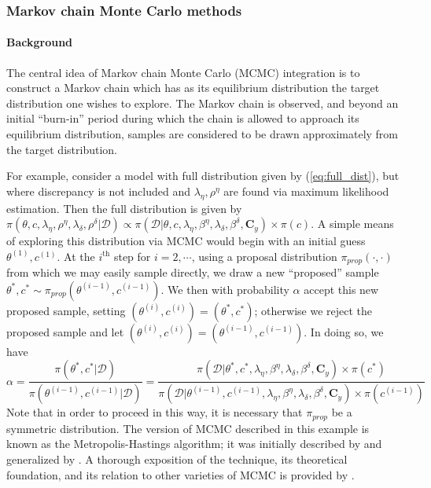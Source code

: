 \documentclass{article}
\begin{document}
\subsubsection{Markov chain Monte Carlo methods}

\paragraph{Background}

The central idea of Markov chain Monte Carlo (MCMC) integration is to construct a Markov chain which has as its equilibrium distribution the target distribution one wishes to explore. The Markov chain is observed, and beyond an initial ``burn-in'' period during which the chain is allowed to approach its equilibrium distribution, samples are considered to be drawn approximately from the target distribution.

For example, consider a model with full distribution given by (\ref{eq:full_dist}), but where discrepancy is not included and $\lambda_\eta,\rho^\eta$ are found via maximum likelihood estimation. Then the full distribution is given by $\pi(\theta,c,\lambda_\eta,\rho^\eta,\lambda_\delta,\rho^\delta|\mathcal D)
\propto \pi(\mathcal D | \theta,c,\lambda_\eta, \beta^\eta,\lambda_\delta,\beta^\delta,\mathbf C_y) \times \pi(c)$. A simple means of exploring this distribution via MCMC would begin with an initial guess $\theta^{(1)},c^{(1)}$. At the $i^{\text{th} }$ step for $i=2,\cdots$, using a proposal distribution $\pi_{prop}(\cdot,\cdot)$ from which we may easily sample directly, we draw a new ``proposed'' sample $\theta^*,c^*\sim \pi_{prop}(\theta^{(i-1)},c^{(i-1)})$. We then with probability $\alpha$ accept this new proposed sample, setting $(\theta^{(i)},c^{(i)}) = (\theta^*,c^*)$; otherwise we reject the proposed sample and let $(\theta^{(i)},c^{(i)}) = (\theta^{(i-1)},c^{(i-1)})$. In doing so, we have 
\[
\alpha = \frac{\pi(\theta^*,c^* | \mathcal D)}{ \pi(\theta^{(i-1)},c^{(i-1)}|\mathcal D) } = 
\frac{ \pi(\mathcal D | \theta^*,c^*,\lambda_\eta, \beta^\eta,\lambda_\delta,\beta^\delta,\mathbf C_y) \times \pi(c^*)}{\pi(\mathcal D | \theta^{(i-1)},c^{(i-1)},\lambda_\eta, \beta^\eta,\lambda_\delta,\beta^\delta,\mathbf C_y) \times \pi(c^{(i-1)})}
\]
Note that in order to proceed in this way, it is necessary that $\pi_{prop}$ be a symmetric distribution. The version of MCMC described in this example is known as the Metropolis-Hastings algorithm; it was initially described by \cite{Metropolis1953} and generalized by \cite{Hastings1970}. A thorough exposition of the technique, its theoretical foundation, and its relation to other  varieties of MCMC is provided by \cite{Chib1995}.
\end{document}
